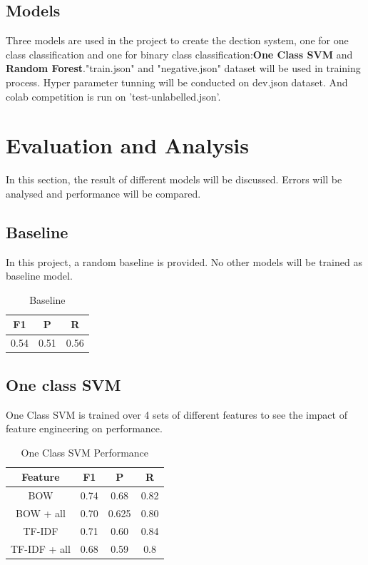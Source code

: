 \documentclass[11pt,a4paper]{article}
\begin{document}
\subsection{Models}
Three models are used in the project to create the dection system, one for one class classification and one for binary class classification:\textbf{One Class SVM} and \textbf{Random Forest}."train.json" and "negative.json" dataset will be used in training process. Hyper parameter tunning will be conducted on dev.json dataset. And colab competition is run on 'test-unlabelled.json'.

\section{Evaluation and Analysis}
In this section, the result of different models will be discussed. Errors will be analysed and performance will be compared.
\subsection{Baseline}
In this project, a random baseline is provided. No other models will be trained as baseline model.
\begin{table}[h!]
  \begin{center}
    \caption{Baseline}
    \label{tab:table1}
    \begin{tabular}{c c c}
      \textbf{F1} & \textbf{P} & \textbf{R}\\
      \hline
      0.54 & 0.51 & 0.56\\
    \end{tabular}
  \end{center}
\end{table}

\subsection{One class SVM}
One Class SVM is trained over 4 sets of different features to see the impact of feature engineering on performance.
\begin{table}[h!]
  \begin{center}
    \caption{One Class SVM Performance}
    \label{tab:table1}
    \begin{tabular}{c c c c}
      \textbf{Feature} & \textbf{F1} & \textbf{P} & \textbf{R}\\
      \hline
      BOW & 0.74 & 0.68 & 0.82\\
      BOW + all & 0.70 & 0.625 & 0.80\\
      TF-IDF & 0.71 & 0.60 & 0.84\\
      TF-IDF + all & 0.68 & 0.59 & 0.8\\
    \end{tabular}
  \end{center}
\end{table}
\end{document}
